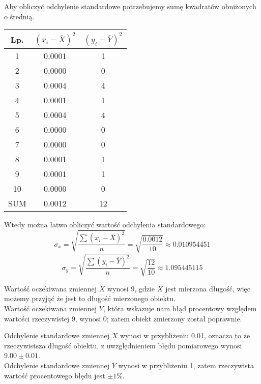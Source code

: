 \documentclass{article}
\begin{document}
Aby obliczyć odchylenie standardowe potrzebujemy sumę kwadratów obniżonych o średnią.
\begin{center}
\begin{tabular}{|c|c|c|}
\hline
Lp. & $(x_i - \overline{X})^2$ & $(y_i - \overline{Y})^2$ \\ \hline
1 & 0.0001	 & 1 \\ \hline
2 & 0.0000	 & 0 \\ \hline
3 & 0.0004	 & 4 \\ \hline
4 & 0.0001	 & 1 \\ \hline
5 & 0.0004	 & 4 \\ \hline
6 & 0.0000	 & 0 \\ \hline
7 & 0.0000	 & 0 \\ \hline
8 & 0.0001	 & 1 \\ \hline
9 & 0.0001	 & 1 \\ \hline
10 & 0.0000 & 0 \\ \hline
SUM & 0.0012 & 12 \\ \hline
\end{tabular}
\end{center}

Wtedy można łatwo obliczyć wartość odchylenia standardowego:
\[ \sigma_x = \sqrt{\frac{\sum (x_i - \overline{X})^2}{n}} = \sqrt{\frac{0.0012}{10}} \approx 0.010954451 \]
\[ \sigma_y = \sqrt{\frac{\sum (y_i - \overline{Y})^2}{n}} = \sqrt{\frac{12}{10}} \approx 1.095445115 \]

Wartość oczekiwana zmiennej $X$ wynosi 9, gdzie $X$ jest mierzona długość, więc możemy przyjąć że jest to długość mierzonego obiektu.\\
Wartość oczekiwana zmiennej $Y$, która wskazuje nam błąd procentowy względem wartości rzeczywistej 9, wynosi 0; zatem obiekt zmierzony został poprawnie. \\ \par
Odchylenie standardowe zmiennej $X$ wynosi w przybliżeniu 0.01, oznacza to że rzeczywistsza długość obiektu, z uwzględnieniem błędu pomiarowego wynosi $9.00 \pm0.01$.\\
 Odchylenie standardowe zmiennej $Y$ wynosi w przybliżeniu 1, zatem rzeczywista wartość procentowego błędu jest $\pm1\%$.
\end{document}
